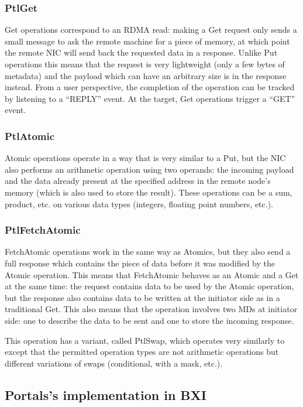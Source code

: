 \subsubsection{PtlGet}

Get operations correspond to an RDMA read: making a Get request only sends a
small message to ask the remote machine for a piece of memory, at which point
the remote NIC will send back the requested data in a response. Unlike Put
operations this means that the request is very lightweight (only a few bytes of
metadata) and the payload which can have an arbitrary size is in the response
instead. From a user perspective, the completion of the operation can be tracked
by listening to a ``REPLY'' event. At the target, Get operations trigger a
``GET'' event.

\subsubsection{PtlAtomic}

Atomic operations operate in a way that is very similar to a Put, but the NIC
also performs an arithmetic operation using two operands: the incoming payload
and the data already present at the specified address in the remote node's
memory (which is also used to store the result). These operations can be a sum,
product, etc. on various data types (integers, floating point numbers, etc.).

\subsubsection{PtlFetchAtomic}

FetchAtomic operations work in the same way as Atomics, but they also send a
full response which contains the piece of data before it was modified by the
Atomic operation. This means that FetchAtomic behaves as an Atomic and a Get at
the same time: the request contains data to be used by the Atomic operation, but
the response also contains data to be written at the initiator side as in a
traditional Get. This also means that the operation involves two MDs at
initiator side: one to describe the data to be sent and one to store the
incoming response.

This operation has a variant, called PtlSwap, which operates very similarly to
 except that the permitted operation types are not
arithmetic operations but different variations of swaps (conditional, with a
mask, etc.).


\subsection{Portals's implementation in BXI}

